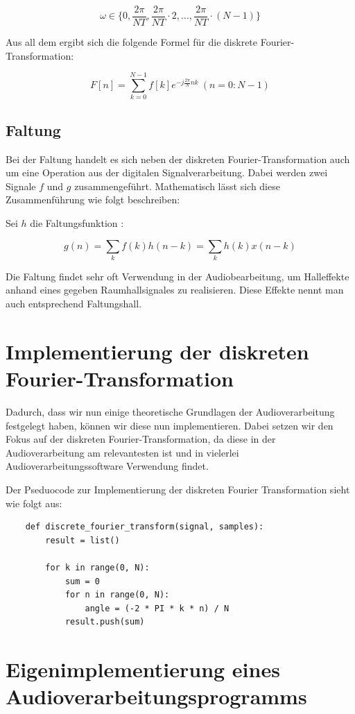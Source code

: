 \documentclass[paper=a4,fontsize=12pt,ngerman]{scrartcl}
\begin{document}
$$\omega \in \{ 0, \frac{2 \pi}{NT}, \frac{2 \pi}{NT} \cdot 2, \dots, \frac{2\pi}{NT} \cdot (N-1) \}$$

Aus all dem ergibt sich die folgende Formel für die diskrete Fourier-Transformation:

$$F[n] = \sum_{k=0}^{N-1} f[k]e^{-j \frac{2 \pi}{N} nk} \ (n = 0: N-1)$$

\subsection{Faltung}

Bei der Faltung handelt es sich neben der diskreten Fourier-Transformation auch um eine Operation aus der digitalen Signalverarbeitung. Dabei werden zwei Signale 
$f$ und $g$ zusammengeführt. Mathematisch lässt sich diese Zusammenführung wie folgt beschreiben:

Sei $h$ die Faltungsfunktion \cite{dolequez}:

$$g(n) = \sum_{k} f(k) h(n-k) = \sum_{k} h(k) x (n-k)$$

Die Faltung findet sehr oft Verwendung in der Audiobearbeitung, um Halleffekte anhand eines gegeben Raumhallsignales zu realisieren. Diese Effekte nennt man auch
entsprechend Faltungshall.

\section{Implementierung der diskreten Fourier-Transformation}

Dadurch, dass wir nun einige theoretische Grundlagen der Audioverarbeitung festgelegt haben, können wir diese nun implementieren. Dabei setzen wir den Fokus auf der diskreten Fourier-Transformation, da 
diese in der Audioverarbeitung am relevantesten ist und in vielerlei Audioverarbeitungssoftware Verwendung findet.

Der Pseduocode zur Implementierung der diskreten Fourier Transformation sieht wie folgt aus:

\begin{lstlisting}
    def discrete_fourier_transform(signal, samples):
        result = list()

        for k in range(0, N):
            sum = 0
            for n in range(0, N):
                angle = (-2 * PI * k * n) / N
            result.push(sum)
\end{lstlisting}

\section {Eigenimplementierung eines Audioverarbeitungsprogramms}
\end{document}
